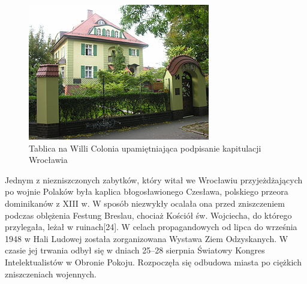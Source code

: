 \documentclass{article}
\begin{document}
\bigskip
\newline
\begin{figure}[h]
\centering
\includegraphics[scale=2]{16.JPG}
\caption{Tablica na Willi Colonia upamiętniająca podpisanie kapitulacji Wrocławia}
\end{figure}
\bigskip
\newline
Jednym z niezniszczonych zabytków, który witał we Wrocławiu przyjeżdżających po wojnie Polaków była kaplica błogosławionego Czesława, polskiego przeora dominikanów z XIII w. W sposób niezwykły ocalała ona przed zniszczeniem podczas oblężenia Festung Breslau, chociaż Kościół św. Wojciecha, do którego przylegała, leżał w ruinach[24].
\bigskip
\newline
W celach propagandowych od lipca do września 1948 w Hali Ludowej została zorganizowana Wystawa Ziem Odzyskanych. W czasie jej trwania odbył się w dniach 25–28 sierpnia Światowy Kongres Intelektualistów w Obronie Pokoju. Rozpoczęła się odbudowa miasta po ciężkich zniszczeniach wojennych.
\end{document}
